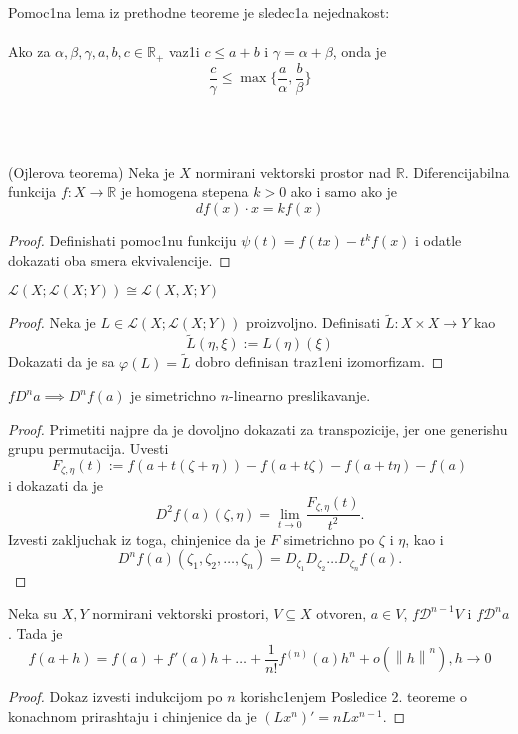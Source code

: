 \documentclass[a4paper,12pt]{article}
\newcommand{\R}{\mathbb{R}}
\newcommand{\psj}{\subseteq}
\newcommand{\norm}[1]{\left\lVert#1\right\rVert}
\begin{document}
\begin{nap}
Pomoc1na lema iz prethodne teoreme je sledec1a nejednakost: \\ \\
Ako za $\alpha, \beta, \gamma, a, b, c \in \R_+ $ vaz1i $c \leq a+b$ i $\gamma = \alpha + \beta$, onda je
\[\frac{c}{\gamma} \leq \max \{ \frac{a}{\alpha}, \frac{b}{\beta} \} \]
\end{nap}
\\ \\
\begin{tma}
(Ojlerova teorema) Neka je $X$ normirani vektorski prostor nad $\R$. Di\-fe\-ren\-ci\-ja\-bil\-na funkcija $f: X \to \R$ je homogena stepena $k>0$ ako i samo ako je \[df(x) \cdot x = k f(x)\]
\end{tma}
\begin{proof}
Definishati pomoc1nu funkciju $\psi (t) = f(tx) - t^kf(x)$ i odatle dokazati oba smera ekvivalencije. 
\end{proof}

\begin{tvr}
$\mathcal{L} (X; \mathcal{L}(X;Y)) \cong \mathcal{L} (X,X; Y)$
\end{tvr}
\begin{proof}
Neka je $L \in \mathcal{L} (X; \mathcal{L}(X;Y))$ proizvoljno. Definisati $\tilde{L} : X \times X \to Y$ kao \[\tilde{L} (\eta, \xi) := L(\eta)(\xi)\]
Dokazati da je sa $\varphi(L) = \tilde{L}$ dobro definisan traz1eni izomorfizam.
\end{proof}

\begin{tvr}
	$fD^n a \implies D^nf(a)$ je simetrichno $n$-linearno preslikavanje.
\end{tvr}
\begin{proof}
	Primetiti najpre da je dovoljno dokazati za transpozicije, jer one generishu grupu permutacija.
	Uvesti \[F_{\zeta, \eta} (t) := f(a +t(\zeta + \eta)) - f(a + t\zeta) - f(a + t\eta) - f(a)\] i 
	dokazati da je \[ D^2f(a)(\zeta, \eta) = \lim_{t\to 0} \dfrac{F_{\zeta, \eta} (t)}{t^2} .\] 
	Izvesti zakljuchak iz toga, chinjenice da je $F$ simetrichno po $\zeta$ i $\eta$, kao i 
	\[ D^nf(a) (\zeta_1, \zeta_2, \dotso, \zeta_n) = D_{\zeta_1}D_{\zeta_2}\dotso D_{\zeta_n} f(a).\]
\end{proof}

\begin{tma}
Neka su $X, Y$ normirani vektorski prostori, $V \psj X$ otvoren, $a \in V$, $f \mathcal{D}^{n-1}V$ i $f\mathcal{D}^n a$. Tada je 
\[f(a+h) = f(a) + f'(a)h + \dots + \frac{1}{n!} f^{(n)}(a) h^n + o(\norm{h}^n), h \to 0\]
\end{tma}
\begin{proof}
Dokaz izvesti indukcijom po $n$ korish\-c1e\-njem Posledice 2. teoreme o konachnom prirashtaju i chinjenice da je $(Lx^n)' = n Lx^{n-1}$.
\end{proof}
\end{document}
